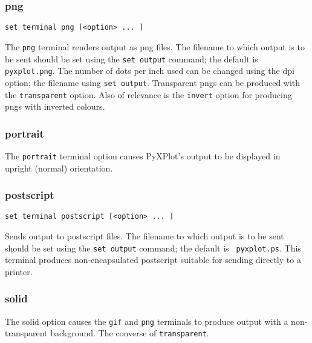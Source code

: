 \subsubsection{png}

\begin{verbatim}
set terminal png [<option> ... ]
\end{verbatim}

The {\tt png} terminal renders output as png files. The filename to which output
is to be sent should be set using the {\tt set output} command; the default is
{\tt pyxplot.png}. The number of dots per inch used can be changed using the dpi
option; the filename using {\tt set output}. Transparent pngs can be produced
with the {\tt transparent} option. Also of relevance is the {\tt invert} option
for producing pngs with inverted colours.


\subsubsection{portrait}

The {\tt portrait} terminal option causes PyXPlot's output to be displayed in
upright (normal) orientation.
 

\subsubsection{postscript}

\begin{verbatim}
set terminal postscript [<option> ... ]
\end{verbatim}

Sends output to postscript files. The filename to which output is to be sent
should be set using the {\tt set output} command; the default is {\tt
pyxplot.ps}.  This terminal produces non-encapsulated postscript suitable for
sending directly to a printer.

\subsubsection{solid}

The solid option causes the {\tt gif} and {\tt png} terminals to produce output
with a non-transparent background. The converse of {\tt transparent}.


